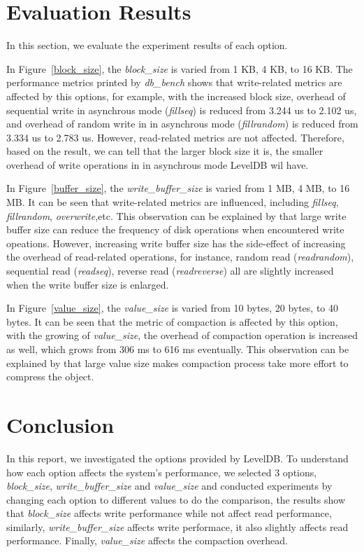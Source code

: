 \documentclass[letter,twocolumn,10pt]{article}
\begin{document}
\section{Evaluation Results}
\label{sec:evaluation}
In this section, we evaluate the experiment results of each option.

In Figure~\ref{block_size}, the \textit{block\_size} is varied from 1 KB, 4 KB, to 16 KB. The performance metrics printed by \textit{db\_bench} shows that write-related metrics are affected by this options, for example, with the increased block size, overhead of sequential write in asynchrous mode (\textit{fillseq}) is reduced from 3.244 us to 2.102 us, and overhead of random write in in asynchrous mode (\textit{fillrandom}) is reduced from 3.334 us to 2.783 us. However, read-related metrics are not affected. Therefore, based on the result, we can tell that the larger block size it is, the smaller overhead of write operations in in asynchrous mode LevelDB wil have. 

In Figure~\ref{buffer_size}, the \textit{write\_buffer\_size} is varied from 1 MB, 4 MB, to 16 MB. It can be seen that write-related metrics are influenced, including \textit{fillseq}, \textit{fillrandom}, \textit{overwrite},etc. This observation can be explained by that large write buffer size can reduce the frequency of disk operations when encountered write opeations. However, increasing write buffer size has the side-effect of increasing the overhead of read-related operations, for instance, random read (\textit{readrandom}), sequential read (\textit{readseq}), reverse read (\textit{readreverse}) all are slightly increased when the write buffer size is enlarged.
 
In Figure~\ref{value_size}, the \textit{value\_size} is varied from 10 bytes, 20 bytes, to 40 bytes. It can be seen that the metric of compaction is affected by this option, with the growing of \textit{value\_size}, the overhead of compaction operation is increased as well, which grows from 306 ms to 616 ms eventually. This observation can be explained by that large value size makes compaction process take more effort to compress the object.  

\section{Conclusion}
\label{sec:conclusion}
In this report, we investigated the options provided by LevelDB. To understand how each option affects the system's performance, we selected 3 options, \textit{block\_size}, \textit{write\_buffer\_size} and \textit{value\_size} and conducted experiments by changing each option to different values to do the comparison, the results show that \textit{block\_size} affects write performance while not affect read performance, similarly, \textit{write\_buffer\_size} affects write performace, it also slightly affects read performance. Finally, \textit{value\_size} affects the compaction overhead.  

{\footnotesize 


}
\end{document}
